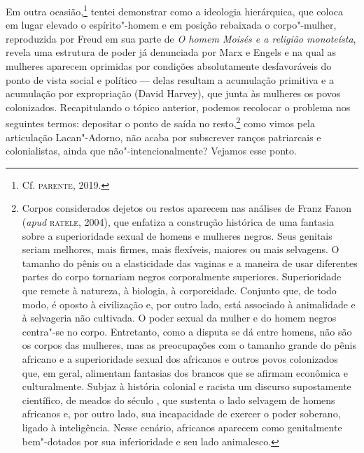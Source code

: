 Em outra ocasião,\footnote{Cf. \textsc{parente}, 2019.} tentei demonstrar
como a ideologia hierárquica, que coloca em lugar elevado o
espírito"-homem e em posição rebaixada o corpo"-mulher, reproduzida por
Freud em sua parte  de \emph{O homem Moisés e a religião monoteísta},
revela uma estrutura de poder já denunciada por Marx e Engels e na qual
as mulheres aparecem oprimidas por condições absolutamente desfavoráveis
do ponto de vista social e político --- delas resultam a acumulação
primitiva e a acumulação por expropriação (David Harvey), que junta às
mulheres os povos colonizados. Recapitulando o tópico anterior, podemos
recolocar o problema nos seguintes termos: depositar o ponto de saída no
resto,\footnote{Corpos considerados dejetos ou restos aparecem nas
  análises de Franz Fanon (\emph{apud} \textsc{ratele}, 2004), que enfatiza a
  construção histórica de uma fantasia sobre a superioridade sexual de
  homens e mulheres negros. Seus genitais seriam melhores, mais firmes,
  mais flexíveis, maiores ou mais selvagens. O tamanho do pênis ou a
  elasticidade das vaginas e a maneira de usar diferentes partes do
  corpo tornariam negros corporalmente superiores. Superioridade que
  remete à natureza, à biologia, à corporeidade. Conjunto que, de todo
  modo, é oposto à civilização e, por outro lado, está associado à
  animalidade e à selvageria não cultivada. O poder sexual da mulher e
  do homem negros centra"-se no corpo. Entretanto, como a disputa se dá
  entre homens, não são os corpos das mulheres, mas as preocupações com
  o tamanho grande do pênis africano e a superioridade sexual dos
  africanos e outros povos colonizados que, em geral, alimentam
  fantasias dos brancos que se afirmam econômica e culturalmente. Subjaz
  à história colonial e racista um discurso supostamente científico, de
  meados do século , que sustenta o lado selvagem de homens africanos
  e, por outro lado, sua incapacidade de exercer o poder soberano,
  ligado à inteligência. Nesse cenário, africanos aparecem como
  genitalmente bem"-dotados por sua inferioridade e seu lado animalesco.}
como vimos pela articulação Lacan"-Adorno, não acaba por subscrever
ranços patriarcais e colonialistas, ainda que não"-intencionalmente?
Vejamos esse ponto.

